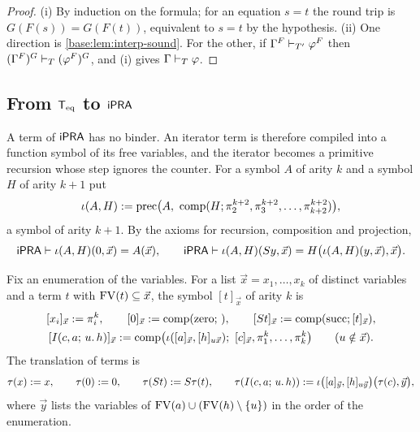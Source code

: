 \begin{proof}
(i) By induction on the formula; for an equation $s=t$ the round trip is
$G(F(s))=G(F(t))$, equivalent to $s=t$ by the hypothesis.  (ii) One
direction is \cref{base:lem:interp-sound}.  For the other, if
$\Gamma^{F}\vdash_{T'}\varphi^{F}$ then
$(\Gamma^{F})^{G}\vdash_{T}(\varphi^{F})^{G}$, and (i) gives
$\Gamma\vdash_{T}\varphi$.
\end{proof}

\subsection{From \texorpdfstring{$\mathsf{T}_{\mathrm{eq}}$}{Teq} to
 \texorpdfstring{$\mathsf{iPRA}$}{iPRA}}

A term of $\mathsf{iPRA}$ has no binder.  An iterator term is therefore compiled
into a function symbol of its free variables, and the iterator becomes a
primitive recursion whose step ignores the counter.  For a symbol $A$ of
arity $k$ and a symbol $H$ of arity $k+1$ put
\[
 \iota(A,H)\defeq\mathrm{prec}\bigl(A,\ \mathrm{comp}(H;\pi^{k+2}_2,
   \pi^{k+2}_3,\dots,\pi^{k+2}_{k+2})\bigr),
\]
a symbol of arity $k+1$.  By the axioms for recursion, composition and
projection,
\begin{equation}
 \mathsf{iPRA}\vdash\iota(A,H)(0,\vec x)=A(\vec x),\qquad
 \mathsf{iPRA}\vdash\iota(A,H)(S y,\vec x)=H\bigl(\iota(A,H)(y,\vec x),\vec x\bigr).
 \label{base:eq:iota}
\end{equation}

\begin{definition}
\label{base:def:tau}
Fix an enumeration of the variables.  For a list
$\vec x=x_1,\dots,x_k$ of distinct variables and a term $t$ with
$\operatorname{FV}(t)\subseteq\vec x$, the symbol $[t]_{\vec x}$ of arity $k$ is
\begin{gather*}
 {}[x_i]_{\vec x}\mathrel{:=}\pi^k_i,\qquad
 {}[0]_{\vec x}\mathrel{:=}\mathrm{comp}(\mathrm{zero};\,),\qquad
 [S t]_{\vec x}\mathrel{:=}\mathrm{comp}(\mathrm{succ};[t]_{\vec x}),\\
 {}[I(c,a;\,u.\,h)]_{\vec x}\mathrel{:=}
  \mathrm{comp}\bigl(\iota([a]_{\vec x},[h]_{u\vec x});\
   [c]_{\vec x},\pi^k_1,\dots,\pi^k_k\bigr)\qquad(u\notin\vec x).
\end{gather*}
The translation of terms is
\[
 \tau(x)\mathrel{:=} x,\qquad\tau(0)\mathrel{:=} 0,\qquad
 \tau(S t)\mathrel{:=}S\tau(t),\qquad
 \tau(I(c,a;\,u.\,h))\mathrel{:=}
  \iota\bigl([a]_{\vec y},[h]_{u\vec y}\bigr)\bigl(\tau(c),\vec y\bigr),
\]
where $\vec y$ lists the variables of $\operatorname{FV}(a)\cup(\operatorname{FV}(h)\setminus\{u\})$ in
the order of the enumeration.
\end{definition}

